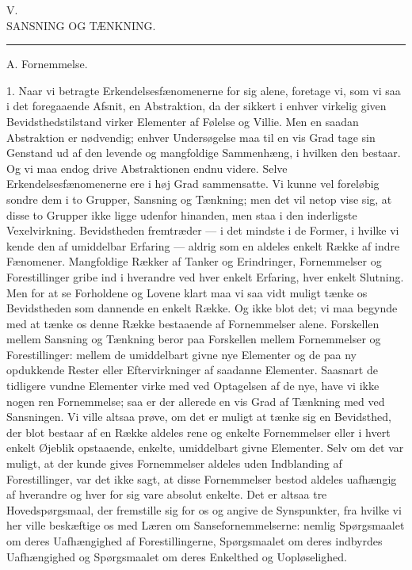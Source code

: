 \documentclass[12pt,a4paper,openany]{book}
\newcommand{\opage}[1]{\marginnote{\footnotesize\textit{[#1]}}}
\begin{document}
\clearpage
\opage{120}\begin{center}V.\\[4pt] SANSNING OG TÆNKNING.\\[2pt]\rule{1.5cm}{0.4pt}\end{center}

\begin{center}A. Fornemmelse.\end{center}

1. Naar vi betragte Erkendelsesfænomenerne for sig alene, foretage vi,
som vi saa i det foregaaende Afsnit, en Abstraktion, da der sikkert i
enhver virkelig given Bevidsthedstilstand virker Elementer af Følelse og
Villie. Men en saadan Abstraktion er nødvendig; enhver Undersøgelse maa
til en vis Grad tage sin Genstand ud af den levende og mangfoldige
Sammenhæng, i hvilken den bestaar. Og vi maa endog drive Abstraktionen
endnu videre. Selve Erkendelsesfænomenerne ere i høj Grad sammensatte.
Vi kunne vel foreløbig sondre dem i to Grupper, Sansning og Tænkning;
men det vil netop vise sig, at disse to Grupper ikke ligge udenfor
hinanden, men staa i den inderligste Vexelvirkning. Bevidstheden
fremtræder --- i det mindste i de Former, i hvilke vi kende den af
umiddelbar Erfaring --- aldrig som en aldeles enkelt Række af indre
Fænomener. Mangfoldige Rækker af Tanker og Erindringer, Fornemmelser og
Forestillinger gribe ind i hverandre ved hver enkelt Erfaring, hver
enkelt Slutning. Men for at se Forholdene og Lovene klart maa vi saa
vidt muligt tænke os Bevidstheden som dannende en enkelt Række. Og ikke
blot det; vi maa begynde med at tænke os denne Række bestaaende af
Fornemmelser alene. Forskellen mellem Sansning og Tænkning beror paa
Forskellen mellem Fornemmelser og Forestillinger: mellem de umiddelbart
givne nye Elementer og de paa ny opdukkende Rester eller Eftervirkninger
af saadanne Elementer. Saasnart de tidligere vundne Elementer virke med
\opage{121}ved Optagelsen af de nye, have vi ikke nogen ren Fornemmelse;
saa er der allerede en vis Grad af Tænkning med ved Sansningen. Vi ville
altsaa prøve, om det er muligt at tænke sig en Bevidsthed, der blot
bestaar af en Række aldeles rene og enkelte Fornemmelser eller i hvert
enkelt Øjeblik opstaaende, enkelte, umiddelbart givne Elementer. Selv om
det var muligt, at der kunde gives Fornemmelser aldeles uden Indblanding
af Forestillinger, var det ikke sagt, at disse Fornemmelser bestod
aldeles uafhængig af hverandre og hver for sig vare absolut enkelte. Det
er altsaa tre Hovedspørgsmaal, der fremstille sig for os og angive de
Synspunkter, fra hvilke vi her ville beskæftige os med Læren om
Sansefornemmelserne: nemlig Spørgsmaalet om deres Uafhængighed af
Forestillingerne, Spørgsmaalet om deres indbyrdes Uafhængighed og
Spørgsmaalet om deres Enkelthed og Uopløselighed.
\end{document}
